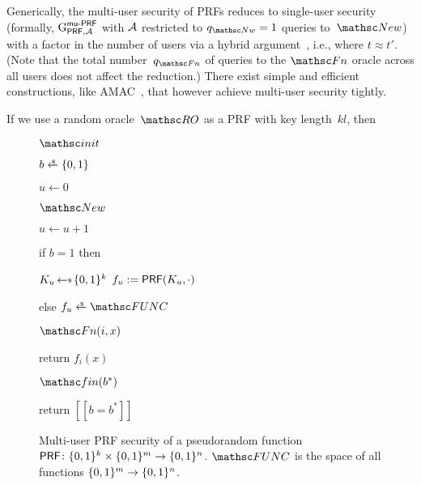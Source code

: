 Generically, the multi-user security of PRFs reduces to single-user security (formally, $\Gm^{\muPRFSEC}_{\PRF,\advA}$ with $\mathcal{A}$ restricted to $\qNew = 1$ queries to~$\New$) with a factor in the number of users via a hybrid argument~\cite{FOCS:BelCanKra96}, i.e., 
where $t \approx t'$. 
(Note that the total number~$\qPRFfn$ of queries to the $\PRFfn$ oracle across all users does not affect the reduction.)
There exist simple and efficient constructions, like AMAC~\cite{EC:BelBerTes16}, that however achieve multi-user security tightly.
\iffull

\fi
If we use a random oracle~$\RO$ as a PRF with key length~$kl$, then

\begin{figure}[t]
	\centering
	
	\begin{minipage}[t]{0.2\textwidth}
		\NewExperiment[$\Gm^{\muPRFSEC}_{\PRF,\advA}$]
		
		\begin{oracle}{$\Initialize$}
			\item $b \sample \bits$
			\item $u \gets 0$
		\end{oracle}
	\end{minipage}
	\begin{minipage}[t]{\iffull0.3\else0.5\fi\textwidth}
		\begin{oracle}{$\New$}
			\item $u \gets u + 1$
			\item if $b = 1$ then
			\item \hindent $K_u \getsr \bits^k$
			\fullelse{\item \hindent}{;} $f_u := \mathsf{PRF}(K_u, \cdot)$
			\item else
			\fullonly{\item \hindent} $f_u \sample \FUNC$
		\end{oracle}
	\end{minipage}
	\begin{minipage}[t]{0.25\textwidth}
		\begin{oracle}{$\PRFfn(i, x)$}
			\item return $f_i(x)$
		\end{oracle}
		
		\ExptSepSpace
		
		\begin{oracle}{$\Finalize(b^*)$}
			\item return $[[ b = b^* ]]$
		\end{oracle}
	\end{minipage}
	
	\caption{%
		Multi-user PRF security of a pseudorandom function~$\mathsf{PRF} \colon \{0,1\}^k \times \{0,1\}^m \to \{0,1\}^n$. $\FUNC$ is the space of all functions $\{0,1\}^m \to \{0,1\}^n$.
	}
	\label{fig:muPRFSEC}
\end{figure}



